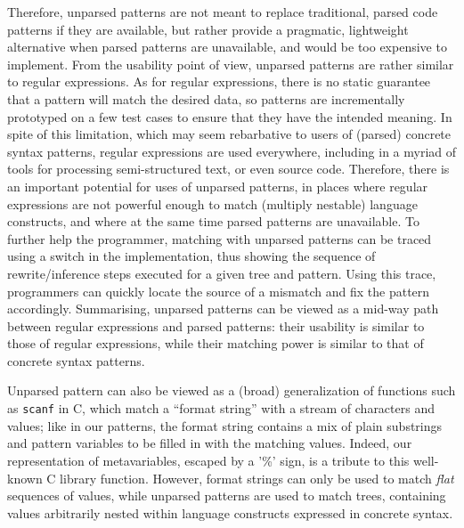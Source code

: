 Therefore, unparsed patterns are not meant to replace traditional,
parsed code patterns if they are available, but rather provide a
pragmatic, lightweight alternative when parsed patterns are
unavailable, and would be too expensive to implement. From the
usability point of view, unparsed patterns are rather similar to
regular expressions. As for regular expressions, there is no static
guarantee that a pattern will match the desired data, so patterns are
incrementally prototyped on a few test cases to ensure that they have
the intended meaning. In spite of this limitation, which may seem
rebarbative to users of (parsed) concrete syntax patterns, regular
expressions are used everywhere, including in a myriad of tools for
processing semi\hyp{}structured text, or even source code. Therefore,
there is an important potential for uses of unparsed patterns, in
places where regular expressions are not powerful enough to match
(multiply nestable) language constructs, and where at the same time
parsed patterns are unavailable. To further help the programmer,
matching with unparsed patterns can be traced using a switch in the
implementation, thus showing the sequence of rewrite/\-inference steps
executed for a given tree and pattern. Using this trace, programmers
can quickly locate the source of a mismatch and fix the pattern
accordingly. Summarising, unparsed patterns can be viewed as a
mid\hyp{}way path between regular expressions and parsed patterns:
their usability is similar to those of regular expressions, while
their matching power is similar to that of concrete syntax patterns.

Unparsed pattern can also be viewed as a (broad) generalization of
functions such as \verb|scanf| in C, which match a ``format string''
with a stream of characters and values; like in our patterns, the
format string contains a mix of plain substrings and pattern variables
to be filled in with the matching values. Indeed, our representation
of meta\-variables, escaped by a '\%' sign, is a tribute to this
well\hyp{}known C library function. However, format strings can only
be used to match \emph{flat} sequences of values, while unparsed
patterns are used to match trees, containing values arbitrarily nested
within language constructs expressed in concrete syntax.

